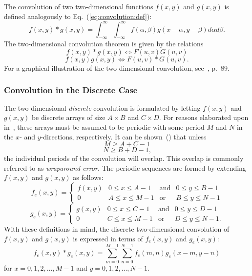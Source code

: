 The convolution of two two-dimensional functions $f(x,y)$ and $g(x,y)$
is defined analogously to Eq.~(\ref{eq:convolution:def}):
\begin{equation}
  f(x,y)\ast g(x,y)=\int_{-\infty}^{\infty}\int_{-\infty}^{\infty}
  f(\alpha,\beta)g(x-\alpha,y-\beta)d\alpha d\beta\mbox{.}
\end{equation}
The two-dimensional convolution theorem is given by the relations
\begin{equation}
\label{eq:convolution:2Da}
  f(x,y)\ast g(x,y)\Leftrightarrow F(u,v)G(u,v)
\end{equation}
\begin{equation}
\label{eq:convolution:2Db}
  f(x,y)g(x,y)\Leftrightarrow F(u,v)\ast G(u,v)\mbox{.}
\end{equation}
For a graphical illustration of the two-dimensional convolution,
see~\cite{digim}, p.\ 89.

\subsubsection{Convolution in the Discrete Case}

The two-dimensional {\em discrete\/} convolution is formulated by
letting $f(x,y)$ and $g(x,y)$ be discrete arrays of size $A\times B$
and $C\times D$.  For reasons elaborated upon in~\cite{brigham}, these
arrays must be assumed to be periodic with some period $M$ and $N$ in
the $x$- and $y$-directions, respectively.  It can be
shown~(\cite{brigham}) that unless
\begin{equation}
  M\geq A+C-1
\end{equation}
\begin{equation}
  N\geq B+D-1\mbox{,}
\end{equation}
the individual periods of the convolution will overlap.  This overlap
is commonly referred to as {\em wraparound error\/}.  The periodic
sequences are formed by extending $f(x,y)$ and $g(x,y)$ as follows:
\begin{equation}
  f_{e}(x,y)=\left\{
    \begin{array}{llll}
      f(x,y) & 0\leq x\leq A-1 & \mbox{and} & 0\leq y\leq B-1 \\
      0      & A\leq x\leq M-1 & \mbox{or}  & B\leq y\leq N-1
    \end{array} \right.
\end{equation}
\begin{equation}
  g_{e}(x,y)=\left\{
    \begin{array}{llll}
      g(x,y) & 0\leq x\leq C-1 & \mbox{and} & 0\leq y\leq D-1 \\
      0      & C\leq x\leq M-1 & \mbox{or}  & D\leq y\leq N-1\mbox{.}
    \end{array} \right.
\end{equation}
With these definitions in mind, the discrete two-dimensional
convolution of $f(x,y)$ and $g(x,y)$ is expressed in terms of
$f_{e}(x,y)$ and $g_{e}(x,y)$:
\begin{equation}
\label{eq:convolution:discrete}
  f_{e}(x,y)\ast g_{e}(x,y)=\sum_{m=0}^{M-1}\sum_{n=0}^{N-1}
  f_{e}(m,n)g_{e}(x-m,y-n)
\end{equation}
for $x=0,1,2,\ldots,M-1$ and $y=0,1,2,\ldots,N-1$.

